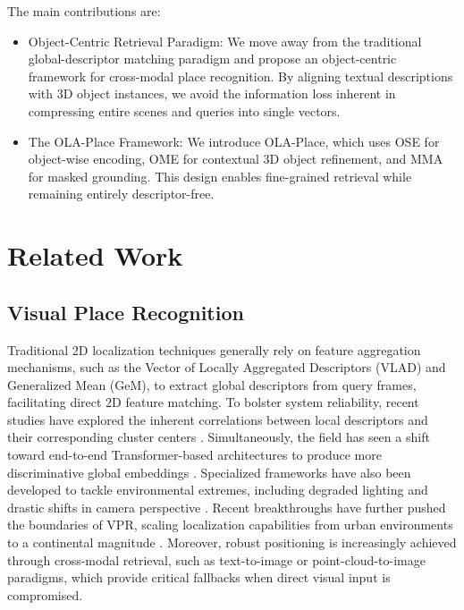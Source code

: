 \documentclass{article}
\begin{document}
The main contributions are:
\begin{itemize}
    \item Object-Centric Retrieval Paradigm: We move away from the traditional global-descriptor matching paradigm and propose an object-centric framework for cross-modal place recognition. By aligning textual descriptions with 3D object instances, we avoid the information loss inherent in compressing entire scenes and queries into single vectors.
    \item The OLA-Place Framework: We introduce OLA-Place, which uses OSE for object-wise encoding, OME for contextual 3D object refinement, and MMA for masked grounding. This design enables fine-grained retrieval while remaining entirely descriptor-free.
\end{itemize}

\section{Related Work}
\subsection{Visual Place Recognition}
Traditional 2D localization techniques generally rely on feature aggregation mechanisms, such as the Vector of Locally Aggregated Descriptors (VLAD) \cite{arandjelovic2016netvlad} and Generalized Mean (GeM), to extract global descriptors from query frames, facilitating direct 2D feature matching. To bolster system reliability, recent studies have explored the inherent correlations between local descriptors and their corresponding cluster centers \cite{li20252}. Simultaneously, the field has seen a shift toward end-to-end Transformer-based architectures to produce more discriminative global embeddings \cite{wang2022transvpr,li2024feature}. Specialized frameworks have also been developed to tackle environmental extremes, including degraded lighting \cite{li2024toward} and drastic shifts in camera perspective \cite{berton2023eigenplaces}. Recent breakthroughs have further pushed the boundaries of VPR, scaling localization capabilities from urban environments to a continental magnitude \cite{lindenberger2025scaling}. Moreover, robust positioning is increasingly achieved through cross-modal retrieval, such as text-to-image \cite{shang2025bridging} or point-cloud-to-image \cite{xu2024c2l} paradigms, which provide critical fallbacks when direct visual input is compromised.
\end{document}
